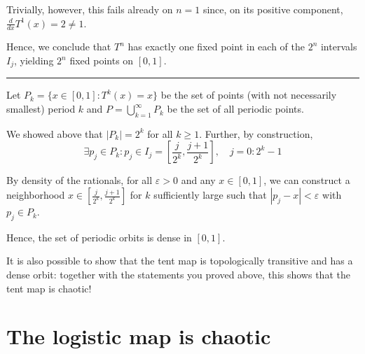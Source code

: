 \documentclass[12pt]{article}
\newcommand{\abs}[1]{\left\vert #1 \right\vert}
\newcommand{\ep}{\varepsilon}
\renewcommand{\div}{\vspace*{10pt}\hrule\vspace*{10pt}}
\begin{document}
\begin{enumerate}[(i)]
          Trivially, however, this fails already on $n=1$ since, on its positive component, $\frac{d}{dx} T^1(x) = 2 \neq 1$.

          Hence, we conclude that $T^n$ has exactly one fixed point in each of the $2^n$ intervals $I_j$, yielding $2^n$ fixed points on $[0, 1]$.

          \div

          Let $P_k = \{x \in [0, 1]: T^k(x) = x\}$ be the set of points (with not necessarily smallest) period $k$ and $P = \bigcup_{k=1}^{\infty} P_k$ be the set of all periodic points.

          We showed above that $\abs{P_k} = 2^k$ for all $k \geq 1$. Further, by construction,
          \[\exists p_j \in P_k: p_j \in I_j = \left[\frac{j}{2^k}, \frac{j+1}{2^k}\right], \quad j=0: 2^k - 1\]

          By density of the rationals, for all $\ep > 0$ and any $x \in [0, 1]$, we can construct a neighborhood $x \in \left[\frac{j}{2^k}, \frac{j+1}{2^k}\right]$ for $k$ sufficiently large such that $\abs{p_j - x} < \ep$ with $p_j \in P_k$.

          Hence, the set of periodic orbits is dense in $[0, 1]$.

          \color{black}

\end{enumerate}
It is also possible to show that the tent map is topologically transitive and has a dense orbit: together with the statements you proved above, this shows that the tent map is chaotic!

\pagebreak

\section{The logistic map is chaotic}
\end{document}
